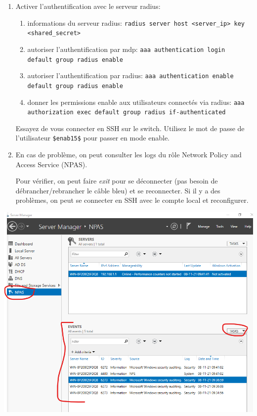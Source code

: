 \documentclass[a4paper]{article}
\begin{document}
\begin{enumerate}
\item Activer l'authentification avec le serveur radius:
\begin{enumerate}
    \item informations du serveur radius: \texttt{radius server host <server\_ip> key <shared\_secret>}
    \item autoriser l'authentification par mdp: \texttt{aaa authentication login default group radius enable}
    \item autoriser l'authentification par radius: \texttt{aaa authentication enable default group radius enable}
    \item donner les permissions enable aux utilisateurs connectés via radius: \texttt{aaa authorization exec default group radius if-authenticated}
\end{enumerate}

Essayez de vous connecter en SSH sur le switch. Utilisez le mot de passe de l'utilisateur \texttt{\$enab15\$} pour passer en mode enable.

\item En cas de problème, on peut consulter les logs du rôle Network Policy and Access Service (NPAS).
\begin{example}
    Pour vérifier, on peut faire \textit{exit} pour se déconnecter (pas besoin de débrancher/rebrancher le câble bleu) et se reconnecter. Si il y a des problèmes, on peut se connecter en SSH avec le compte local et reconfigurer.
\end{example}

\end{enumerate}

\begin{center} \includegraphics[width=0.90\linewidth]{images/logs-npas.png} \end{center}
\end{document}
